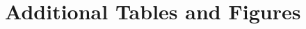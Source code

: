 \documentclass[useAMS,usenatbib]{mn2e}
\newcommand{\lrb}[1]{\left({#1}\right)}
\begin{document}



\section{Additional Tables and Figures}\label{sec:other_tables_figures}
\end{document}
